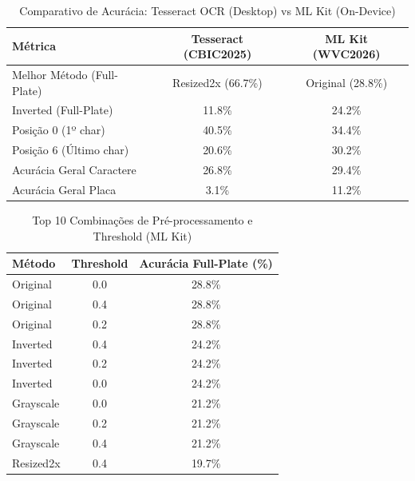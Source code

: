 \begin{table}[h]
\centering
\caption{Comparativo de Acurácia: Tesseract OCR (Desktop) vs ML Kit (On-Device)}
\label{tab:comparative}
\begin{tabular}{|l|c|c|}
\hline
\textbf{Métrica} & \textbf{Tesseract (CBIC2025)} & \textbf{ML Kit (WVC2026)} \\ \hline
Melhor Método (Full-Plate) & Resized2x (66.7\%) & Original (28.8\%) \\
Inverted (Full-Plate) & 11.8\% & 24.2\% \\
Posição 0 (1º char) & 40.5\% & 34.4\% \\
Posição 6 (Último char) & 20.6\% & 30.2\% \\
Acurácia Geral Caractere & 26.8\% & 29.4\% \\
Acurácia Geral Placa & 3.1\% & 11.2\% \\ \hline
\end{tabular}
\end{table}

\begin{table}[h]
\centering
\caption{Top 10 Combinações de Pré-processamento e Threshold (ML Kit)}
\label{tab:top10}
\begin{tabular}{|l|c|c|}
\hline
\textbf{Método} & \textbf{Threshold} & \textbf{Acurácia Full-Plate (\%)} \\ \hline
Original & 0.0 & 28.8\% \\
Original & 0.4 & 28.8\% \\
Original & 0.2 & 28.8\% \\
Inverted & 0.4 & 24.2\% \\
Inverted & 0.2 & 24.2\% \\
Inverted & 0.0 & 24.2\% \\
Grayscale & 0.0 & 21.2\% \\
Grayscale & 0.2 & 21.2\% \\
Grayscale & 0.4 & 21.2\% \\
Resized2x & 0.4 & 19.7\% \\
\hline
\end{tabular}
\end{table}
